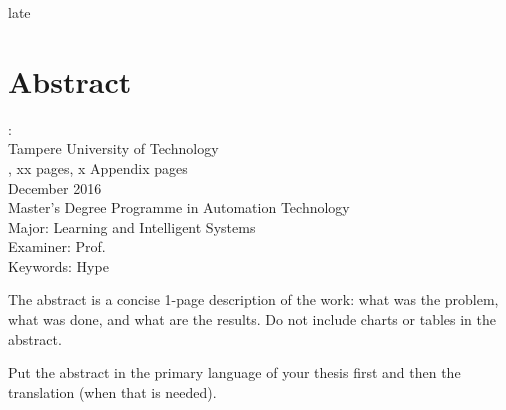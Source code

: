 \documentclass[12pt,a4paper,english
]{tutthesis}
\begin{document}
late\chapter*{Abstract}

\begin{spacing}{1.0}
         {\bf \textsf{\MakeUppercase{\@author}}}: \@title\\   %
         \textsf{Tampere University of Technology}\\
         \textsf{\@thesistype, xx pages, x Appendix pages} \\
         \textsf{December 2016}\\
         \textsf{Master's Degree Programme in Automation Technology}\\
         \textsf{Major: Learning and Intelligent Systems}\\
         \textsf{Examiner: Prof. \@examiner}\\ %
         \textsf{Keywords: Hype}\\
\end{spacing}


The abstract is a concise 1-page description of the work: what was the
problem, what was done, and what are the results. Do not include
charts or tables in the abstract.

Put the abstract in the primary language of your thesis first and then
the translation (when that is needed).


\end{document}
